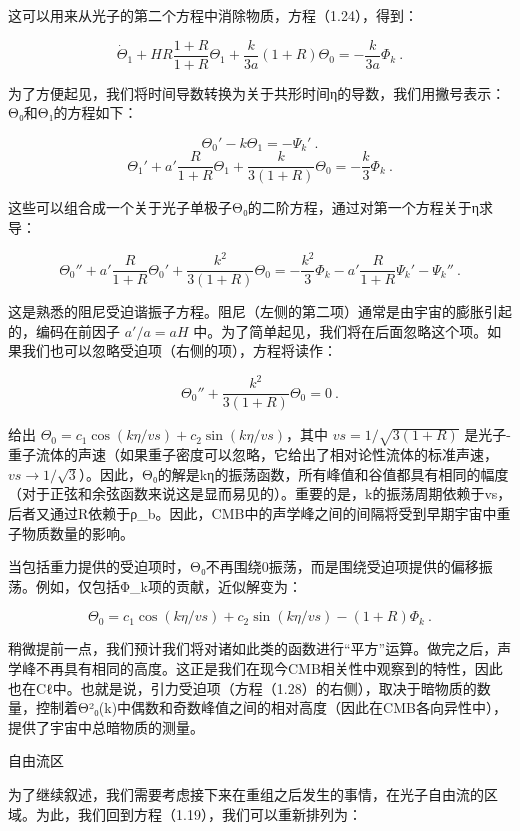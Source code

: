这可以用来从光子的第二个方程中消除物质，方程（1.24），得到：

\[ \dot{\Theta}_1 + H R \frac{1 + R}{1 + R} \Theta_1 + \frac{k}{3a} (1 + R) \Theta_0 = -\frac{k}{3a} \Phi_k ~.\]

为了方便起见，我们将时间导数转换为关于共形时间η的导数，我们用撇号表示：Θ₀和Θ₁的方程如下：

\[ \Theta_0' - k \Theta_1 = -\Psi_k'~. \]
\[ \Theta_1' + a' \frac{R}{1 + R} \Theta_1 + \frac{k}{3(1 + R)} \Theta_0 = -\frac{k}{3} \Phi_k~. \]

这些可以组合成一个关于光子单极子Θ₀的二阶方程，通过对第一个方程关于η求导：

\[ \Theta_0'' + a' \frac{R}{1 + R} \Theta_0' + \frac{k^2}{3(1 + R)} \Theta_0 = -\frac{k^2}{3} \Phi_k - a' \frac{R}{1 + R} \Psi_k' - \Psi_k''~. \]

这是熟悉的阻尼受迫谐振子方程。阻尼（左侧的第二项）通常是由宇宙的膨胀引起的，编码在前因子 \( a'/a = aH \) 中。为了简单起见，我们将在后面忽略这个项。如果我们也可以忽略受迫项（右侧的项），方程将读作：

\[ \Theta_0'' + \frac{k^2}{3(1 + R)} \Theta_0 = 0~. \]

给出 \( \Theta_0 = c_1 \cos(k\eta/vs) + c_2 \sin(k\eta/vs) \)，其中 \( vs = 1/\sqrt{3(1 + R)} \) 是光子-重子流体的声速（如果重子密度可以忽略，它给出了相对论性流体的标准声速，\( vs \rightarrow 1/\sqrt{3} \)）。因此，Θ₀的解是kη的振荡函数，所有峰值和谷值都具有相同的幅度（对于正弦和余弦函数来说这是显而易见的）。重要的是，k的振荡周期依赖于vs，后者又通过R依赖于ρ_b。因此，CMB中的声学峰之间的间隔将受到早期宇宙中重子物质数量的影响。

当包括重力提供的受迫项时，Θ₀不再围绕0振荡，而是围绕受迫项提供的偏移振荡。例如，仅包括Φ_k项的贡献，近似解变为：

\[ \Theta_0 = c_1 \cos(k\eta/vs) + c_2 \sin(k\eta/vs) - (1 + R) \Phi_k~. \]

稍微提前一点，我们预计我们将对诸如此类的函数进行“平方”运算。做完之后，声学峰不再具有相同的高度。这正是我们在现今CMB相关性中观察到的特性，因此也在Cℓ中。也就是说，引力受迫项（方程（1.28）的右侧），取决于暗物质的数量，控制着Θ²₀(k)中偶数和奇数峰值之间的相对高度（因此在CMB各向异性中），提供了宇宙中总暗物质的测量。

自由流区

为了继续叙述，我们需要考虑接下来在重组之后发生的事情，在光子自由流的区域。为此，我们回到方程（1.19），我们可以重新排列为：





